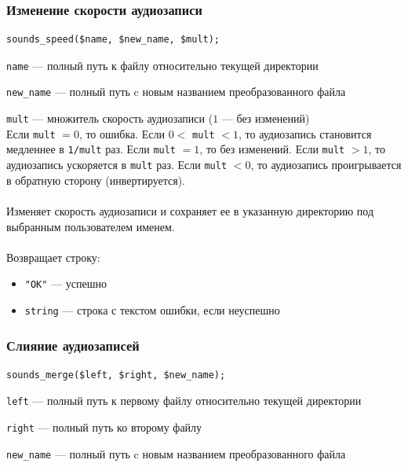\documentclass[14pt,a4paper]{article}
\begin{document}
\subsubsection*{Изменение скорости аудиозаписи}

\begin{lstlisting}
sounds_speed($name, $new_name, $mult);
\end{lstlisting}

\lstinline{name} --- полный путь к файлу относительно текущей директории \par
\lstinline{new_name} --- полный путь c новым названием преобразованного файла \par
\lstinline{mult} --- множитель скорость аудиозаписи ($1$ --- без изменений) \\

\noindent Если \lstinline{mult} $= 0$, то ошибка. Если $0 <$ \lstinline{mult} $< 1$, то аудиозапись становится медленнее в \lstinline{1/mult} раз. Если \lstinline{mult} $= 1$, то без изменений. Если \lstinline{mult} $> 1$, то аудиозапись ускоряется в \lstinline{mult} раз. Если \lstinline{mult} $< 0$, то аудиозапись проигрывается в обратную сторону (инвертируется).\\\\
Изменяет скорость аудиозаписи и сохраняет ее в указанную директорию под выбранным пользователем именем. \\\\
Возвращает строку:
\smallskip
\begin{itemize}
\item \lstinline{"OK"} --- успешно
\item \lstinline{string} --- строка с текстом ошибки, если неуспешно
\end{itemize}

\subsubsection*{Слияние аудиозаписей}

\begin{lstlisting}
sounds_merge($left, $right, $new_name);
\end{lstlisting}

\lstinline{left} --- полный путь к первому файлу относительно текущей директории \par
\lstinline{right} --- полный путь ко второму файлу \par
\lstinline{new_name} --- полный путь c новым названием преобразованного файла \\
\end{document}
